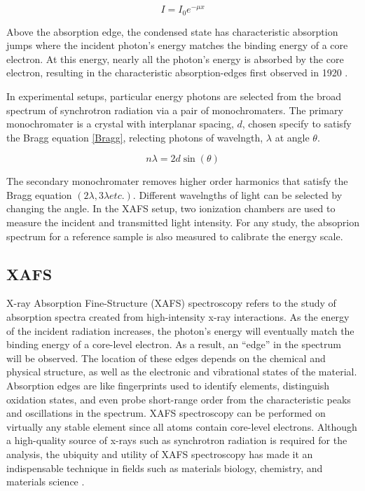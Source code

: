 \begin{equation}
    \label{BeerLambert}
    I = I_0 e^{-\mu x}
\end{equation}

Above the absorption edge, the condensed state has characteristic absorption jumps where the incident photon's energy matches the binding energy of a core electron. At this energy, nearly all the photon's energy is absorbed by the core electron, resulting in the characteristic absorption-edges first observed in 1920 \cite{fricke1920, hertz1920ueber}.

In experimental setups, particular energy photons are selected from the broad spectrum of synchrotron radiation via a pair of monochromaters. The primary monochromater is a crystal with interplanar spacing, $ d $, chosen specify to satisfy the Bragg equation \ref{Bragg}, relecting photons of wavelngth, $ \lambda $ at angle $ \theta $.  

\begin{equation}
    \label{Bragg}
    n\lambda = 2d\sin(\theta)
\end{equation}

The secondary monochromater removes higher order harmonics that satisfy the Bragg equation $ (2\lambda, 3\lambda etc.). $ Different wavelngths of light can be selected by changing the angle. In the XAFS setup, two ionization chambers are used to measure the incident and transmitted light intensity. For any study, the absoprion spectrum for a reference sample is also measured to calibrate the energy scale.


\subsection{XAFS}
X-ray Absorption Fine-Structure (XAFS) spectroscopy refers to the study of absorption spectra created from high-intensity x-ray interactions. As the energy of the incident radiation increases, the photon's energy will eventually match the binding energy of a core-level electron. As a result, an ``edge'' in the spectrum will be observed. The location of these edges depends on the chemical and physical structure, as well as the electronic and vibrational states of the material. Absorption edges are like fingerprints used to identify elements, distinguish oxidation states, and even probe short-range order from the characteristic peaks and oscillations in the spectrum. XAFS spectroscopy can be performed on virtually any stable element since all atoms contain core-level electrons. Although a high-quality source of x-rays such as synchrotron radiation is required for the analysis, the ubiquity and utility of XAFS spectroscopy has made it an indispensable technique in fields such as materials biology, chemistry, and materials science \cite{rehrXAFS2000review} \cite{newville2014fundamentals}.

